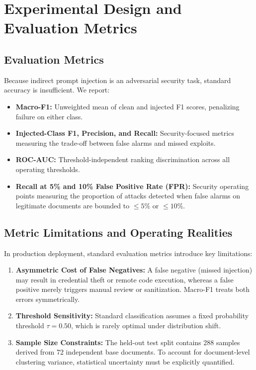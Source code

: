 \documentclass[10pt,conference]{IEEEtran}
\begin{document}
\section{Experimental Design and Evaluation Metrics}

\subsection{Evaluation Metrics}
Because indirect prompt injection is an adversarial security task, standard accuracy is insufficient. We report:
\begin{itemize}
    \item \textbf{Macro-F1:} Unweighted mean of clean and injected F1 scores, penalizing failure on either class.
    \item \textbf{Injected-Class F1, Precision, and Recall:} Security-focused metrics measuring the trade-off between false alarms and missed exploits.
    \item \textbf{ROC-AUC:} Threshold-independent ranking discrimination across all operating thresholds.
    \item \textbf{Recall at 5\% and 10\% False Positive Rate (FPR):} Security operating points measuring the proportion of attacks detected when false alarms on legitimate documents are bounded to $\le 5\%$ or $\le 10\%$.
\end{itemize}

\subsection{Metric Limitations and Operating Realities}
In production deployment, standard evaluation metrics introduce key limitations:
\begin{enumerate}
    \item \textbf{Asymmetric Cost of False Negatives:} A false negative (missed injection) may result in credential theft or remote code execution, whereas a false positive merely triggers manual review or sanitization. Macro-F1 treats both errors symmetrically.
    \item \textbf{Threshold Sensitivity:} Standard classification assumes a fixed probability threshold $\tau = 0.50$, which is rarely optimal under distribution shift.
    \item \textbf{Sample Size Constraints:} The held-out test split contains 288 samples derived from 72 independent base documents. To account for document-level clustering variance, statistical uncertainty must be explicitly quantified.
\end{enumerate}
\end{document}
